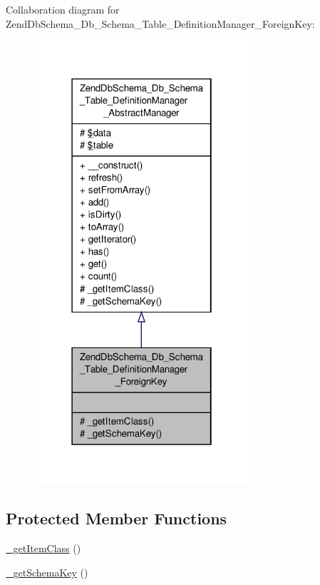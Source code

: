 Collaboration diagram for Zend\-Db\-Schema\-\_\-\-Db\-\_\-\-Schema\-\_\-\-Table\-\_\-\-Definition\-Manager\-\_\-\-Foreign\-Key\-:\nopagebreak
\begin{figure}[H]
\begin{center}
\leavevmode
\includegraphics[width=226pt]{classZendDbSchema__Db__Schema__Table__DefinitionManager__ForeignKey__coll__graph}
\end{center}
\end{figure}
\subsection*{Protected Member Functions}
\begin{DoxyCompactItemize}
\item 
\hyperlink{classZendDbSchema__Db__Schema__Table__DefinitionManager__ForeignKey_a0115ad0d19116a1e2154193d3a204862}{\-\_\-get\-Item\-Class} ()
\item 
\hyperlink{classZendDbSchema__Db__Schema__Table__DefinitionManager__ForeignKey_a58d87365153cc9ffd9c9636b1dde918d}{\-\_\-get\-Schema\-Key} ()
\end{DoxyCompactItemize}

